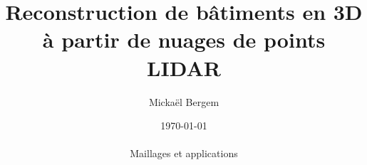 \title{\textbf{Reconstruction de bâtiments en 3D à partir de nuages de points LIDAR} \\ \vspace{2cm} }

\author{Mickaël Bergem}
\date{\today  \\ \textcolor{white}{  } \\ \textcolor{white}{  }Maillages et applications}
\thispagestyle{empty}

\newpage